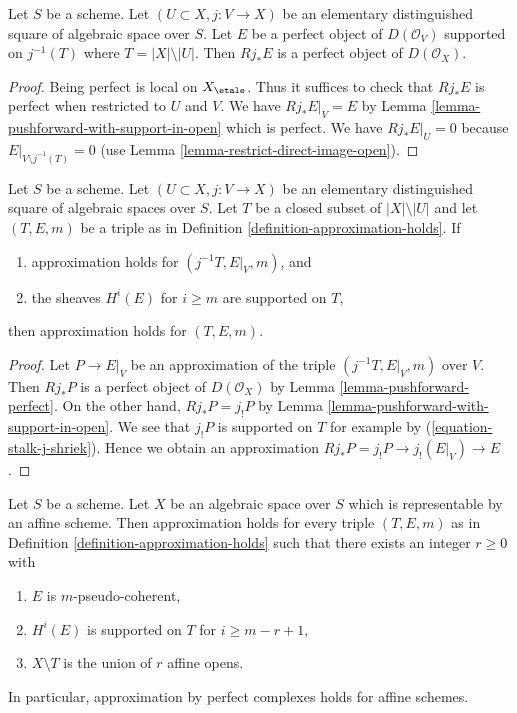 \begin{lemma}
\label{lemma-pushforward-perfect}
Let $S$ be a scheme. Let $(U \subset X, j : V \to X)$ be an
elementary distinguished square of algebraic space over $S$.
Let $E$ be a perfect object of $D(\mathcal{O}_V)$ supported on
$j^{-1}(T)$ where $T = |X| \setminus |U|$. Then $Rj_*E$ is a
perfect object of $D(\mathcal{O}_X)$.
\end{lemma}

\begin{proof}
Being perfect is local on $X_\etale$. Thus it suffices to
check that $Rj_*E$ is perfect when restricted to $U$ and $V$.
We have $Rj_*E|_V = E$ by Lemma \ref{lemma-pushforward-with-support-in-open}
which is perfect. We have $Rj_*E|_U = 0$ because
$E|_{V \setminus j^{-1}(T)} = 0$ (use
Lemma \ref{lemma-restrict-direct-image-open}).
\end{proof}

\begin{lemma}
\label{lemma-open}
Let $S$ be a scheme. Let $(U \subset X, j : V \to X)$ be an elementary
distinguished square of algebraic spaces over $S$. Let $T$ be a closed
subset of $|X| \setminus |U|$ and let $(T, E, m)$ be a triple as in
Definition \ref{definition-approximation-holds}. If
\begin{enumerate}
\item approximation holds for $(j^{-1}T, E|_V, m)$, and
\item the sheaves $H^i(E)$ for $i \geq m$ are supported on $T$,
\end{enumerate}
then approximation holds for $(T, E, m)$.
\end{lemma}

\begin{proof}
Let $P \to E|_V$ be an approximation of the triple $(j^{-1}T, E|_V, m)$
over $V$. Then $Rj_*P$ is a perfect object of $D(\mathcal{O}_X)$ by
Lemma \ref{lemma-pushforward-perfect}. On the other hand,
$Rj_*P = j_!P$ by Lemma \ref{lemma-pushforward-with-support-in-open}.
We see that $j_!P$ is supported on $T$ for example by
(\ref{equation-stalk-j-shriek}).
Hence we obtain an approximation $Rj_*P = j_!P \to j_!(E|_V) \to E$.
\end{proof}

\begin{lemma}
\label{lemma-approximation-affine}
Let $S$ be a scheme. Let $X$ be an algebraic space over $S$ which is
representable by an affine scheme. Then approximation holds for every
triple $(T, E, m)$ as in Definition \ref{definition-approximation-holds}
such that there exists an integer $r \geq 0$ with
\begin{enumerate}
\item $E$ is $m$-pseudo-coherent,
\item $H^i(E)$ is supported on $T$ for $i \geq m - r + 1$,
\item $X \setminus T$ is the union of $r$ affine opens.
\end{enumerate}
In particular, approximation by perfect complexes holds for affine schemes.
\end{lemma}

